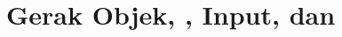 \documentclass[../../main.tex]{subfiles}
\begin{document}
\chapter{Gerak Objek, , Input, dan }
\label{chap:gerak-objek}
























\ifSubfilesClassLoaded{%
  \clearpage
}{}
\end{document}
